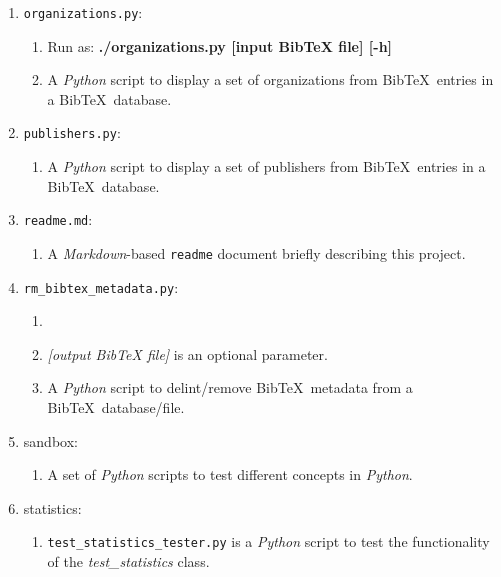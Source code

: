 \begin{enumerate}
\begin{enumerate}
	\end{enumerate}
\item {\tt organizations.py}: \vspace{-0.3cm}
	\begin{enumerate} \itemsep -2pt
	\item Run as: {\bf ./organizations.py [input BibTeX file] [-h]}
	\item A {\it Python} script to display a set of organizations from {\sc Bib}\TeX\ entries in a {\sc Bib}\TeX\ database.
	\end{enumerate}
\item {\tt publishers.py}: \vspace{-0.3cm}
	\begin{enumerate} \itemsep -2pt
	\item A {\it Python} script to display a set of publishers from {\sc Bib}\TeX\ entries in a {\sc Bib}\TeX\ database.
	\end{enumerate}
\item {\tt readme.md}: \vspace{-0.3cm}
	\begin{enumerate} \itemsep -2pt
	\item A {\it Markdown}-based {\tt readme} document briefly describing this project.
	\end{enumerate}
\item {\tt rm\_bibtex\_metadata.py}: \vspace{-0.3cm}
	\begin{enumerate} \itemsep -2pt
	\item 
	\item {\it [output BibTeX file]} is an optional parameter.
	\item A {\it Python} script to delint/remove {\sc Bib}\TeX\ metadata from a {\sc Bib}\TeX\ database/file.
	\end{enumerate}
\item sandbox: \vspace{-0.3cm}
	\begin{enumerate} \itemsep -2pt
	\item A set of {\it Python} scripts to test different concepts in {\it Python}.
	\end{enumerate}
\item statistics: \vspace{-0.3cm}
	\begin{enumerate} \itemsep -2pt
	\item {\tt test\_statistics\_tester.py} is a {\it Python} script to test the functionality of the {\it test\_statistics} class.

\end{enumerate}
\end{enumerate}
